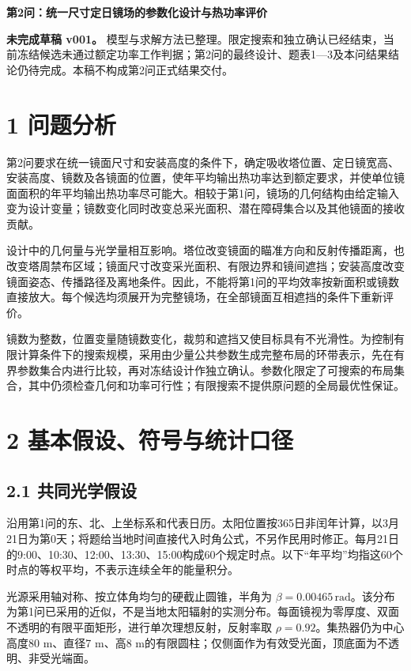 \documentclass[UTF8,fontset=windows,zihao=-4]{ctexart}
\begin{document}
\begin{center}{\LARGE\bfseries 第2问：统一尺寸定日镜场的参数化设计与热功率评价}\end{center}

\textbf{未完成草稿 v001。} 模型与求解方法已整理。限定搜索和独立确认已经结束，当前冻结候选未通过额定功率工作判据；第2问的最终设计、题表1—3及本问结果结论仍待完成。本稿不构成第2问正式结果交付。

\section*{1 问题分析}

第2问要求在统一镜面尺寸和安装高度的条件下，确定吸收塔位置、定日镜宽高、安装高度、镜数及各镜面的位置，使年平均输出热功率达到额定要求，并使单位镜面面积的年平均输出热功率尽可能大。相较于第1问，镜场的几何结构由给定输入变为设计变量；镜数变化同时改变总采光面积、潜在障碍集合以及其他镜面的接收贡献。

设计中的几何量与光学量相互影响。塔位改变镜面的瞄准方向和反射传播距离，也改变塔周禁布区域；镜面尺寸改变采光面积、有限边界和镜间遮挡；安装高度改变镜面姿态、传播路径及离地条件。因此，不能将第1问的平均效率按新面积或镜数直接放大。每个候选均须展开为完整镜场，在全部镜面互相遮挡的条件下重新评价。

镜数为整数，位置变量随镜数变化，裁剪和遮挡又使目标具有不光滑性。为控制有限计算条件下的搜索规模，采用由少量公共参数生成完整布局的环带表示，先在有界参数集合内进行比较，再对冻结设计作独立确认。参数化限定了可搜索的布局集合，其中仍须检查几何和功率可行性；有限搜索不提供原问题的全局最优性保证。

\section*{2 基本假设、符号与统计口径}

\subsection*{2.1 共同光学假设}

沿用第1问的东、北、上坐标系和代表日历。太阳位置按365日非闰年计算，以3月21日为第0天；将题给当地时间直接代入时角公式，不另作民用时修正。每月21日的9:00、10:30、12:00、13:30、15:00构成60个规定时点。以下“年平均”均指这60个时点的等权平均，不表示连续全年的能量积分。

光源采用轴对称、按立体角均匀的硬截止圆锥，半角为 \(\beta=0.00465\,\mathrm{rad}\)。该分布为第1问已采用的近似，不是当地太阳辐射的实测分布。每面镜视为零厚度、双面不透明的有限平面矩形，进行单次理想反射，反射率取 \(\rho=0.92\)。集热器仍为中心高度80 m、直径7 m、高8 m的有限圆柱；仅侧面作为有效受光面，顶底面为不透明、非受光端面。
\end{document}

